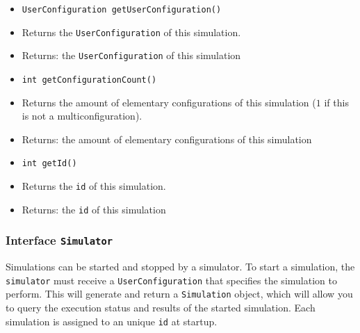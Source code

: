 \documentclass[parskip=full,11pt]{scrartcl}
\begin{document}
\begin{itemize}
	\item \texttt{UserConfiguration getUserConfiguration()}
	\item[] Returns the \texttt{UserConfiguration} of this simulation.
	\item[] Returns: the \texttt{UserConfiguration} of this simulation
	
	\item \texttt{int getConfigurationCount()}
	\item[] Returns the amount of elementary configurations of this simulation (\(1\) if this is not a multiconfiguration).
	\item[] Returns: the amount of elementary configurations of this simulation
	
	\item \texttt{int getId()}
	\item[] Returns the \texttt{id} of this simulation.
	\item[] Returns: the \texttt{id} of this simulation
\end{itemize}

\subsubsection{Interface \texttt{Simulator}}
Simulations can be started and stopped by a simulator. To start a simulation, the \texttt{simulator} must receive a \texttt{UserConfiguration} that specifies the simulation to perform. This will generate and return a \texttt{Simulation} object, which will allow you to query the execution status and results of the started simulation. Each simulation is assigned to an unique \texttt{id} at startup.
\end{document}
